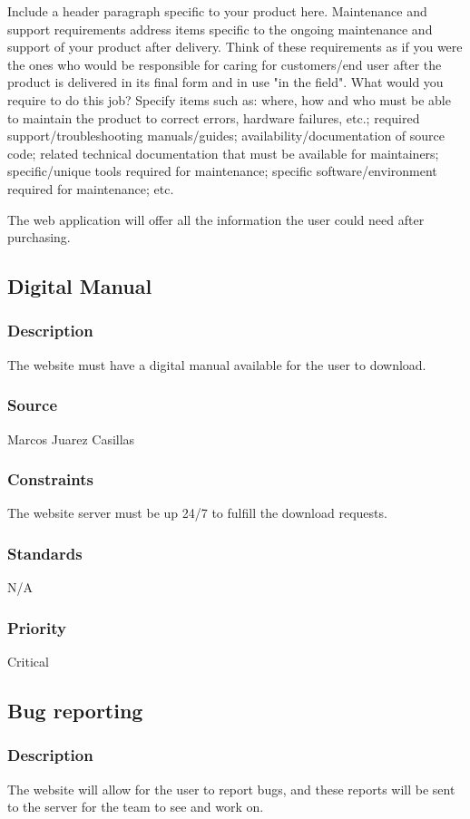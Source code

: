 Include a header paragraph specific to your product here. Maintenance and support requirements address items specific to the ongoing maintenance and support of your product after delivery. Think of these requirements as if you were the ones who would be responsible for caring for customers/end user after the product is delivered in its final form and in use "in the field". What would you require to do this job? Specify items such as: where, how and who must be able to maintain the product to correct errors, hardware failures, etc.; required support/troubleshooting manuals/guides; availability/documentation of source code; related technical documentation that must be available for maintainers; specific/unique tools required for maintenance; specific software/environment required for maintenance; etc.

The web application will offer all the information the user could need after purchasing. 

\subsection{Digital Manual}
\subsubsection{Description}
The website must have a digital manual available for the user to download.
\subsubsection{Source}
Marcos Juarez Casillas
\subsubsection{Constraints}
The website server must be up 24/7 to fulfill the download requests.
\subsubsection{Standards}
N/A
\subsubsection{Priority}
Critical

\subsection{Bug reporting}
\subsubsection{Description}
The website will allow for the user to report bugs, and these reports will be sent to the server for the team to see and work on.
